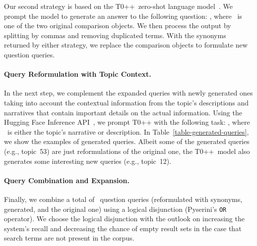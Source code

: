 Our second strategy is based on the T0++~zero-shot language model~\cite{SanhWRBSACSLRDBXTSSKCNDCJWMSYPBWNRSSFFTBGBWR2021}.
We prompt the model to generate an answer to the following question: , where ~is one of the two original comparison objects. 
We then process the output by splitting by commas and removing duplicated terms.
With the synonyms returned by either strategy, we replace the comparison objects to formulate new question queries.

\paragraph{Query Reformulation with Topic Context.}


In the next step, we complement the expanded queries with newly generated ones taking into account the contextual information from the topic's descriptions and narratives that
contain important details on the actual information.
Using the Hugging Face Inference API~\cite{WolfDSCDMCRLFDSPMJPXSGDLR2020}, we prompt T0++ with the following task: , where ~is either the topic's narrative or description. 
In Table~\ref{table-generated-queries}, we show the examples of generated queries.
Albeit some of the generated queries (e.g., topic~53) are just reformulations of the original one, the T0++~model also generates some interesting new queries (e.g., topic~12).

\paragraph{Query Combination and Expansion.}

Finally, we combine a total of ~question queries (reformulated with synonyms, generated, and the original one) using a logical disjunction (Pyserini's \texttt{OR} operator).
We choose the logical disjunction with the outlook on increasing the system's recall and decreasing the chance of empty result sets in the case that search terms are not present in the corpus.

